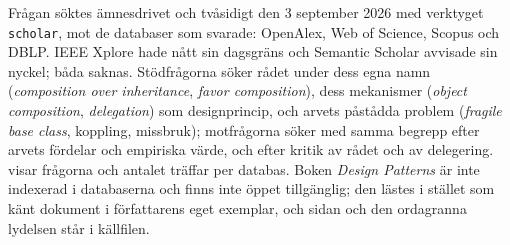Frågan söktes ämnesdrivet och tvåsidigt den 3 september 2026 med
verktyget \texttt{scholar}, mot de databaser som svarade: OpenAlex, Web
of Science, Scopus och DBLP.  IEEE Xplore hade nått sin dagsgräns och
Semantic Scholar avvisade sin nyckel; båda saknas.  Stödfrågorna söker
rådet under dess egna namn (\emph{composition over inheritance},
\emph{favor composition}), dess mekanismer (\emph{object composition},
\emph{delegation}) som designprincip, och arvets påstådda problem
(\emph{fragile base class}, koppling, missbruk); motfrågorna söker med
samma begrepp efter arvets fördelar och empiriska värde, och efter
kritik av rådet och av delegering.   visar
frågorna och antalet träffar per databas.  Boken \emph{Design
Patterns} är inte indexerad i databaserna och finns inte öppet
tillgänglig; den lästes i stället som känt dokument i författarens eget
exemplar, och sidan och den ordagranna lydelsen står i källfilen.

